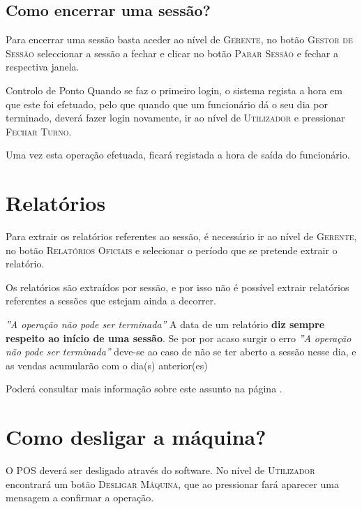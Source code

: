 \documentclass[a4paper,11pt,openany]{memoir}
\begin{document}
\subsection{Como encerrar uma sessão?}


Para encerrar uma sessão basta aceder ao nível de \textsc{Gerente}, no botão \textsc{Gestor de Sessão} 
 seleccionar a sessão a fechar e clicar no botão \textsc{Parar Sessão} e fechar a
respectiva janela.

\begin{bclogo}[couleur=blue!10,arrondi=0.1,logo=\bclampe,ombre=true]{Controlo de Ponto}
Quando se faz o primeiro login, o sistema regista a hora em que este foi efetuado, 
pelo que quando que um funcionário dá o seu dia por terminado, deverá fazer login novamente, 
ir ao nível de \textsc{Utilizador} e pressionar \textsc{Fechar Turno}.

Uma vez esta operação efetuada, ficará registada a hora de saída do funcionário.
\end{bclogo}



\section{Relatórios}

Para extrair os relatórios referentes ao sessão, é necessário ir ao nível de 
\textsc{Gerente}, no botão \textsc{Relatórios Oficiais} e selecionar o período
que se pretende extrair o relatório.

Os relatórios são extraídos por sessão, e por isso não é possível extrair relatórios referentes a sessões 
que estejam ainda a decorrer.

 
\begin{bclogo}[couleur=blue!10,arrondi=0.1,logo=\bctakecare,ombre=true]{\emph{''A operação não pode ser terminada''}} 
A data de um relatório \textbf{diz sempre respeito ao início de uma sessão}. Se por por acaso surgir o erro \emph{''A operação não pode ser terminada''} 
deve-se ao caso de não se ter aberto a sessão nesse dia, e as vendas acumularão com o dia(s) anterior(es)
\end{bclogo}

Poderá consultar mais informação sobre este assunto na página \pageref{reports}.

\section{Como desligar a máquina?}
O POS deverá ser desligado através do software. No nível de \textsc{Utilizador} encontrará
um botão \textsc{Desligar Máquina}, que ao pressionar fará aparecer uma mensagem a
confirmar a operação. 
\end{document}

